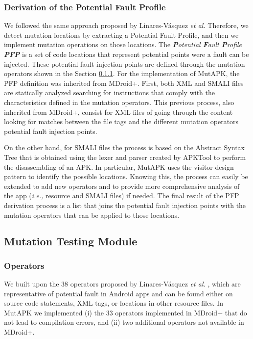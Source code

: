 \subsubsection{Derivation of the Potential Fault Profile}

We followed the same approach proposed by Linares-V\'asquez \emph{et al.} \cite{linares2017enabling,Moran:ICSE18} Therefore, we detect mutation locations by extracting a Potential Fault Profile, and then we implement mutation operations on those locations. The \textit{\textbf{P}otential \textbf{F}ault \textbf{P}rofile \textbf{PFP}} is a set of code locations that represent potential points were a fault can be injected. These potential fault injection points are defined through the mutation operators shown in the Section \ref{sssec:imo}. For the implementation of MutAPK, the PFP definition was inherited from MDroid+. First, both XML and SMALI files are statically analyzed searching for instructions that comply with the characteristics defined in the mutation operators. This previous process, also inherited from MDroid+, consist for XML files of going through the content looking for matches between the file tags and the different mutation operators potential fault injection points. 

On the other hand, for SMALI files the process is based on the Abstract Syntax Tree that is obtained using the lexer and parser created by APKTool to perform the disassembling of an APK. In particular, MutAPK uses the visitor design pattern  to identify the possible locations. Knowing this, the process can easily be extended to add new operators and to provide more comprehensive analysis of the app (\textit{i.e.,} resource and SMALI files) if needed. The final result of the PFP derivation process is a list that joins the potential fault injection points with the mutation operators that can be applied to those locations.
\subsection{Mutation Testing Module}
\subsubsection{Operators}
\label{sssec:imo}
We built upon the 38 operators proposed by  Linares-V\'asquez \emph{et al.} \cite{linares2017enabling,Moran:ICSE18} , which are representative of  potential fault in Android apps and  can be found either on  source code statements, XML tags, or locations in other resource files. In MutAPK we implemented (i) the 33 operators implemented in MDroid+ that do not lead to compilation errors, and (ii) two additional operators not available in MDroid+.

